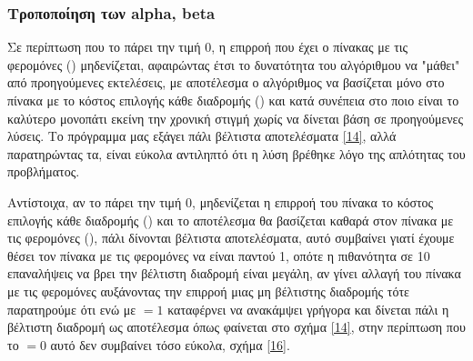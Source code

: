 \subsubsection{Τροποποίηση των alpha, beta}
Σε περίπτωση που το  πάρει την τιμή 0, η επιρροή που έχει ο πίνακας με τις φερομόνες () μηδενίζεται, αφαιρώντας έτσι το δυνατότητα του αλγόριθμου να "μάθει" από προηγούμενες εκτελέσεις, με αποτέλεσμα ο αλγόριθμος να βασίζεται μόνο στο πίνακα με το κόστος επιλογής κάθε διαδρομής () και κατά συνέπεια στο ποιο είναι το καλύτερο μονοπάτι εκείνη την χρονική στιγμή χωρίς να δίνεται βάση σε προηγούμενες λύσεις. Το πρόγραμμα μας εξάγει πάλι βέλτιστα αποτελέσματα \ref{14}, αλλά παρατηρώντας τα, είναι εύκολα αντιληπτό ότι η λύση βρέθηκε λόγο της απλότητας του προβλήματος. 

Αντίστοιχα, αν το  πάρει την τιμή 0, μηδενίζεται η επιρροή του πίνακα το κόστος επιλογής κάθε διαδρομής () και το αποτέλεσμα θα βασίζεται καθαρά στον πίνακα με τις φερομόνες (), πάλι δίνονται βέλτιστα αποτελέσματα, αυτό συμβαίνει γιατί έχουμε θέσει τον πίνακα με τις φερομόνες να είναι παντού 1, οπότε η πιθανότητα σε 10 επαναλήψεις να βρει την βέλτιστη διαδρομή είναι μεγάλη, αν γίνει αλλαγή του πίνακα με τις φερομόνες αυξάνοντας την επιρροή μιας μη βέλτιστης διαδρομής τότε παρατηρούμε ότι ενώ με $=1$ καταφέρνει να ανακάμψει γρήγορα και δίνεται πάλι η βέλτιστη διαδρομή ως αποτέλεσμα όπως φαίνεται στο σχήμα \ref{14}, στην περίπτωση που το $=0$ αυτό δεν συμβαίνει τόσο εύκολα, σχήμα \ref{16}.

